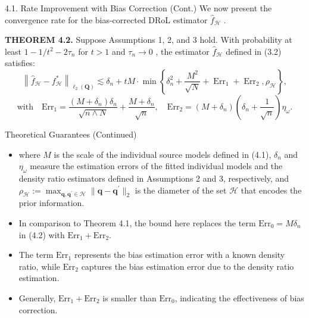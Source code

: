 \documentclass{beamer}
\begin{document}
\begin{frame}{4.1. Rate Improvement with Bias Correction (Cont.)}
    We now present the convergence rate for the bias-corrected DRoL estimator $\widehat { f } _ { \mathcal { H } }$ .
    
    \textbf{THEOREM 4.2.} Suppose Assumptions 1, 2, and 3 hold. With probability at least $1 - 1 / t ^ { 2 } - 2 \tau _ { n }$ for $t > 1$ and $\tau _ { n } \to 0$ , the estimator $\widehat { f } _ { \mathcal { H } }$ defined in (3.2) satisfies:
    $$
    \left\| \widehat {f} _ {\mathcal {H}} - f _ {\mathcal {H}} ^ {*} \right\| _ {\ell_ {2} (\mathbf {Q})} \lesssim \delta_ {n} + t M \cdot \min \left\{\delta_ {n} ^ {2} + \frac {M ^ {2}}{\sqrt {N}} + \operatorname{Err} _ {1} + \operatorname{Err} _ {2}, \rho_ {\mathcal {H}} \right\}, 
    $$
    $$
    \text{with} \quad \mathrm{Err} _ {1} = \frac {(M + \delta_ {n}) \delta_ {n}}{\sqrt {n \wedge N}} + \frac {M + \delta_ {n}}{\sqrt {n}}, \quad \mathrm{Err} _ {2} = (M + \delta_ {n}) (\delta_ {n} + \frac {1}{\sqrt {n}}) \eta_ {\omega}.
    $$
\end{frame}
\begin{frame}{Theoretical Guarantees (Continued)}
    \begin{itemize}
        \item where $M$ is the scale of the individual source models defined in (4.1), $\delta_{n}$ and $\eta_{\omega}$ measure the estimation errors of the fitted individual models and the density ratio estimators defined in Assumptions 2 and 3, respectively, and $\rho_{\mathcal{H}} := \operatorname*{max}_{\boldsymbol{q}, \boldsymbol{q}^{\prime} \in \mathcal{H}} \| \boldsymbol{q} - \boldsymbol{q}^{\prime} \|_{2}$ is the diameter of the set $\mathcal{H}$ that encodes the prior information.
        \item In comparison to Theorem 4.1, the bound here replaces the term $\mathrm{Err}_{0} = M \delta_{n}$ in (4.2) with $\mathrm{Err}_{1} + \mathrm{Err}_{2}$.
        \item The term $\mathrm{Err}_{1}$ represents the bias estimation error with a known density ratio, while $\mathrm{Err_{2}}$ captures the bias estimation error due to the density ratio estimation.
        \item Generally, $\mathrm{Err_{1} + Err_{2}}$ is smaller than $\mathrm{Err}_{0}$, indicating the effectiveness of bias correction.
    \end{itemize}
\end{frame}
\end{document}
